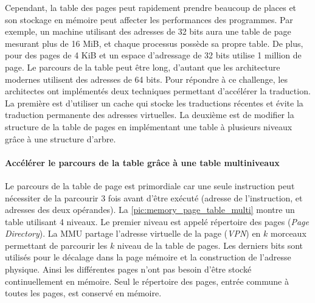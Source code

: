 Cependant, la table des pages peut rapidement prendre beaucoup de places et son stockage en mémoire peut affecter les performances des programmes. Par exemple, un machine utilisant des adresses de 32 bits aura une table de page mesurant plus de 16 MiB, et chaque processus possède sa propre table. De plus, pour des pages de 4 KiB et un espace d'adressage de 32 bits utilise 1 million de page. Le parcours de la table peut être long, d'autant que les architecture modernes utilisent des adresses de 64 bits. Pour répondre à ce challenge, les architectes ont implémentés deux techniques permettant d'accélérer la traduction. La première est d'utiliser un cache qui stocke les traductions récentes et évite la traduction permanente des adresses virtuelles. La deuxième est de modifier la structure de la table de pages en implémentant une table à plusieurs niveaux grâce à une structure d'arbre. 


\paragraph{Accélérer le parcours de la table grâce à une table multiniveaux} Le parcours de la table de page est primordiale car une seule instruction peut nécessiter de la parcourir 3 fois avant d'être exécuté (adresse de l'instruction, et adresses des deux opérandes). La \autoref{pic:memory_page_table_multi} montre un table utilisant 4 niveaux. Le premier niveau est appelé répertoire des pages (\textit{Page Directory}). La MMU partage l'adresse virtuelle de la page (\textit{VPN}) en $k$ morceaux permettant de parcourir les $k$ niveau de la table de pages. Les derniers bits sont utilisés pour le décalage dans la page mémoire et la construction de l'adresse physique. Ainsi les différentes pages  n'ont pas besoin d'être stocké continuellement en mémoire. Seul le répertoire des pages, entrée commune à toutes les pages, est conservé en mémoire. 


